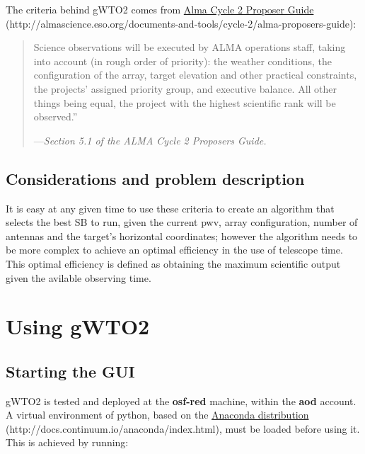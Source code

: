 \documentclass[a4paper,10pt,english]{sphinxmanual}
\begin{document}
The criteria behind gWTO2 comes from \href{http://almascience.eso.org/documents-and-tools/cycle-2/alma-proposers-guide}{Alma Cycle 2 Proposer Guide} (http://almascience.eso.org/documents-and-tools/cycle-2/alma-proposers-guide):
\begin{quote}

Science observations will be executed by ALMA operations staff, taking into
account (in rough order of priority): the weather conditions,
the configuration of the array, target elevation and other practical
constraints, the projects’ assigned priority group, and executive balance.
All other things being equal, the project with the highest scientific rank
will be observed.''

\begin{flushright}
---\emph{Section 5.1 of the ALMA Cycle 2 Proposers Guide.}
\end{flushright}
\end{quote}


\section{Considerations and problem description}
\label{intro2:considerations-and-problem-description}
It is easy at any given time to use these criteria to create an algorithm that
selects the best SB to run, given the current pwv, array configuration,
number of antennas and the target's horizontal coordinates; however the
algorithm needs to be more complex to achieve an optimal efficiency in the use
of telescope time. This optimal efficiency is defined as obtaining the maximum
scientific output given the avilable observing time.


\chapter{Using gWTO2}
\label{usingwto:using-gwto2}\label{usingwto::doc}

\section{Starting the GUI}
\label{usingwto:starting-the-gui}
gWTO2 is tested and deployed at the \textbf{osf-red} machine, within the \textbf{aod} account.
A virtual environment of python, based on the
\href{http://docs.continuum.io/anaconda/index.html}{Anaconda distribution} (http://docs.continuum.io/anaconda/index.html),
must be loaded before using it. This is achieved by running:
\end{document}
